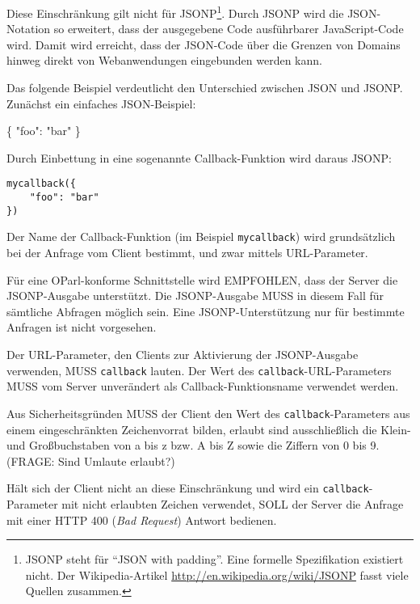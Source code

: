 \documentclass[,a4paper]{article}
\newenvironment{Shaded}{}{}
\newcommand{\DataTypeTok}[1]{\textcolor[rgb]{0.56,0.13,0.00}{{#1}}}
\newcommand{\StringTok}[1]{\textcolor[rgb]{0.25,0.44,0.63}{{#1}}}
\newcommand{\FunctionTok}[1]{\textcolor[rgb]{0.02,0.16,0.49}{{#1}}}
\begin{document}
Diese Einschränkung gilt nicht für JSONP\footnote{JSONP steht für ``JSON
  with padding''. Eine formelle Spezifikation existiert nicht. Der
  Wikipedia-Artikel \url{http://en.wikipedia.org/wiki/JSONP} fasst viele
  Quellen zusammen.}. Durch JSONP wird die JSON-Notation so erweitert,
dass der ausgegebene Code ausführbarer JavaScript-Code wird. Damit wird
erreicht, dass der JSON-Code über die Grenzen von Domains hinweg direkt
von Webanwendungen eingebunden werden kann.

Das folgende Beispiel verdeutlicht den Unterschied zwischen JSON und
JSONP. Zunächst ein einfaches JSON-Beispiel:

\begin{Shaded}
\begin{Highlighting}[]
\FunctionTok{\{}
    \DataTypeTok{"foo"}\FunctionTok{:} \StringTok{"bar"}
\FunctionTok{\}}
\end{Highlighting}
\end{Shaded}

Durch Einbettung in eine sogenannte Callback-Funktion wird daraus JSONP:

\begin{verbatim}
mycallback({
    "foo": "bar"
})
\end{verbatim}

Der Name der Callback-Funktion (im Beispiel \texttt{mycallback}) wird
grundsätzlich bei der Anfrage vom Client bestimmt, und zwar mittels
URL-Parameter.

Für eine OParl-konforme Schnittstelle wird EMPFOHLEN, dass der Server
die JSONP-Ausgabe unterstützt. Die JSONP-Ausgabe MUSS in diesem Fall für
sämtliche Abfragen möglich sein. Eine JSONP-Unterstützung nur für
bestimmte Anfragen ist nicht vorgesehen.

Der URL-Parameter, den Clients zur Aktivierung der JSONP-Ausgabe
verwenden, MUSS \texttt{callback} lauten. Der Wert des
\texttt{callback}-URL-Parameters MUSS vom Server unverändert als
Callback-Funktionsname verwendet werden.

Aus Sicherheitsgründen MUSS der Client den Wert des
\texttt{callback}-Parameters aus einem eingeschränkten Zeichenvorrat
bilden, erlaubt sind ausschließlich die Klein- und Großbuchstaben von a
bis z bzw. A bis Z sowie die Ziffern von 0 bis 9. (FRAGE: Sind Umlaute
erlaubt?)

Hält sich der Client nicht an diese Einschränkung und wird ein
\texttt{callback}-Parameter mit nicht erlaubten Zeichen verwendet, SOLL
der Server die Anfrage mit einer HTTP 400 (\emph{Bad Request}) Antwort
bedienen.
\end{document}
